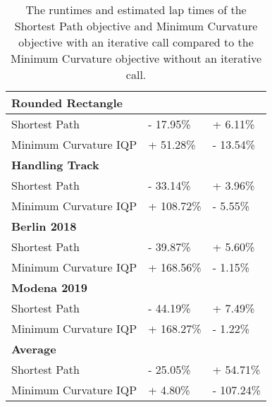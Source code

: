 \begin{table}[H]
\begin{tabular}{|lll|}
        \multicolumn{3}{|l|}{\textbf{Rounded Rectangle}}                                                                                       \\ \hline
        \multicolumn{1}{|l|}{Shortest Path}         & \multicolumn{1}{l|}{- 17.95\%}        & \multicolumn{1}{l|}{+ 6.11\%}                    \\ \hline
        \multicolumn{1}{|l|}{Minimum Curvature IQP} & \multicolumn{1}{l|}{+ 51.28\%}        & \multicolumn{1}{l|}{- 13.54\%}                   \\ \hline
        \multicolumn{3}{|l|}{\textbf{Handling Track}}                                                                                          \\ \hline
        \multicolumn{1}{|l|}{Shortest Path}         & \multicolumn{1}{l|}{- 33.14\%}        & \multicolumn{1}{l|}{+ 3.96\%}                    \\ \hline
        \multicolumn{1}{|l|}{Minimum Curvature IQP} & \multicolumn{1}{l|}{+ 108.72\%}       & \multicolumn{1}{l|}{- 5.55\%}                    \\ \hline
        \multicolumn{3}{|l|}{\textbf{Berlin 2018}}                                                                                             \\ \hline
        \multicolumn{1}{|l|}{Shortest Path}         & \multicolumn{1}{l|}{- 39.87\%}        & \multicolumn{1}{l|}{+ 5.60\%}                    \\ \hline
        \multicolumn{1}{|l|}{Minimum Curvature IQP} & \multicolumn{1}{l|}{+ 168.56\%}       & \multicolumn{1}{l|}{- 1.15\%}                    \\ \hline
        \multicolumn{3}{|l|}{\textbf{Modena 2019}}                                                                                             \\ \hline
        \multicolumn{1}{|l|}{Shortest Path}         & \multicolumn{1}{l|}{- 44.19\%}        & \multicolumn{1}{l|}{+ 7.49\%}                    \\ \hline
        \multicolumn{1}{|l|}{Minimum Curvature IQP} & \multicolumn{1}{l|}{+ 168.27\%}       & \multicolumn{1}{l|}{- 1.22\%}                    \\ \hline
        \multicolumn{3}{|l|}{\textbf{Average}}                                                                                                 \\ \hline
        \multicolumn{1}{|l|}{Shortest Path}         & \multicolumn{1}{l|}{- 25.05\%}        & \multicolumn{1}{l|}{+ 54.71\%}                   \\ \hline
        \multicolumn{1}{|l|}{Minimum Curvature IQP} & \multicolumn{1}{l|}{+ 4.80\%}         & \multicolumn{1}{l|}{- 107.24\%}                  \\ \hline
    \end{tabular}
    \caption{The runtimes and estimated lap times of the Shortest Path objective and Minimum Curvature objective with an iterative call compared to the Minimum Curvature objective without an iterative call.}
    \label{tab:Results Optimization Objectives Average}
\end{table}